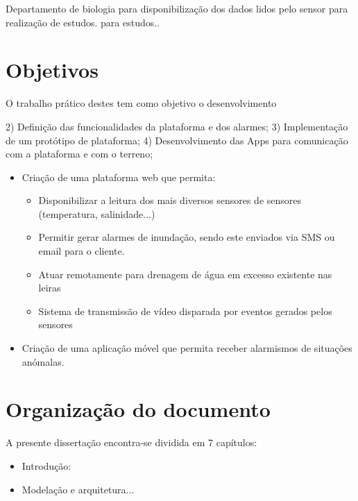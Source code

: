 Departamento de biologia para disponibilização dos dados lidos pelo sensor para realização de estudos. 
para estudos.. 





\section{Objetivos}

O trabalho prático destes  tem como objetivo o desenvolvimento 


2) Definição das funcionalidades da plataforma e dos alarmes;
3) Implementação de um protótipo de plataforma;
4) Desenvolvimento das Apps para comunicação com a plataforma e com o terreno;


\begin{itemize}
    \item Criação de uma plataforma web que permita: 

    \begin{itemize}
        \item Disponibilizar a leitura dos mais diversos sensores de sensores (temperatura, salinidade...)
        
        \item Permitir gerar alarmes de inundação, sendo este enviados via SMS ou email para o cliente. 
        
        \item Atuar remotamente para drenagem de água em excesso existente nas leiras
        
        \item Sistema de transmissão de vídeo disparada por eventos gerados pelos sensores
        
        
    \end{itemize}
    
    \item Criação de uma aplicação móvel que permita receber alarmismos de situações anómalas. 
\end{itemize}


\section{Organização do documento}


A presente dissertação encontra-se dividida em 7 capítulos:

\begin{itemize}
	\item Introdução: 
	
	\item Modelação e arquitetura... 
	
\end{itemize}

